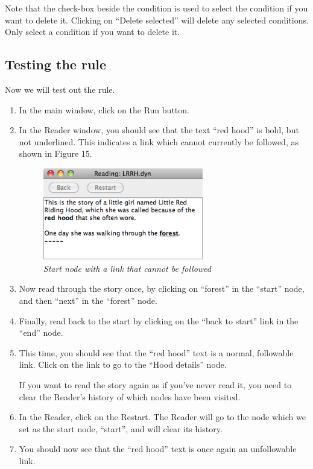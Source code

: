 \documentclass{article}
\begin{document}
Note that the check-box beside the condition is used to select the condition if you
want to delete it. Clicking on ``Delete selected'' will delete any selected
conditions. Only select a condition if you want to delete it.


\subsection{Testing the rule}

Now we will test out the rule.

\begin{enumerate}
  \item In the main window, click on the Run button.
  \item In the Reader window, you should see that the text ``red hood'' is bold,
  but not underlined. This indicates a link which cannot currently be
  followed, as shown in Figure 15.

 
\begin{figure}[ht]
  \centering
  \includegraphics[width=7cm]{images/hypedyn-tutorial-1-figure-15}
  \caption{\textit{Start node with a link that cannot be followed}}
\end{figure} 

\item Now read through the story once, by clicking on ``forest'' in the
``start'' node, and then ``next'' in the ``forest'' node.
\item Finally, read back to the start by clicking on the ``back to start'' link
in the ``end'' node.
\item This time, you should see that the ``red hood'' text is a normal,
followable link. Click on the link to go to the ``Hood details'' node.

If you want to read the story again as if you've never read it, you need to
clear the Reader's history of which nodes have been visited.

\item In the Reader, click on the Restart. The Reader will go to the node which
we set as the start node, ``start'', and will clear its history.
\item You should now see that the ``red hood'' text is once again an
unfollowable link.
\end{enumerate}
\end{document}
